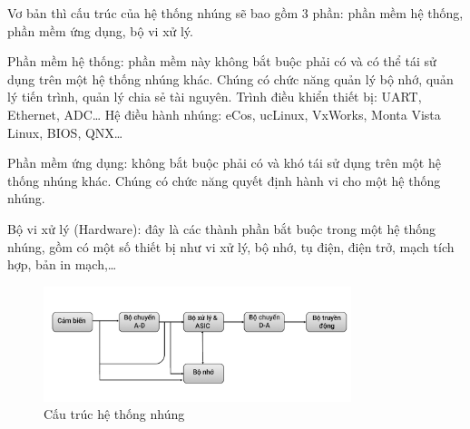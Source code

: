 
Vơ bản thì cấu trúc của hệ thống nhúng sẽ bao gồm 3 phần: phần mềm hệ thống, phần mềm ứng dụng, bộ vi xử lý.

Phần mềm hệ thống: phần mềm này không bắt buộc phải có và có thể tái sử dụng trên một hệ thống nhúng khác. Chúng có chức năng quản lý bộ nhớ, quản lý tiến trình, quản lý chia sẻ tài nguyên. Trình điều khiển thiết bị: UART, Ethernet, ADC… Hệ điều hành nhúng: eCos, ucLinux, VxWorks, Monta Vista Linux, BIOS, QNX…

Phần mềm ứng dụng: không bắt buộc phải có và khó tái sử dụng trên một hệ thống nhúng khác. Chúng có chức năng quyết định hành vi cho một hệ thống nhúng.

Bộ vi xử lý (Hardware): đây là các thành phần bắt buộc trong một hệ thống nhúng, gồm có một số thiết bị như vi xử lý, bộ nhớ, tụ điện, điện trở, mạch tích hợp, bản in mạch,…

\begin{figure}[H]
	\centering
	\includegraphics[width=0.8\textwidth]{../images/cau-truc-he-thong-nhung.png}
	\caption{Cấu trúc hệ thống nhúng}
\end{figure}